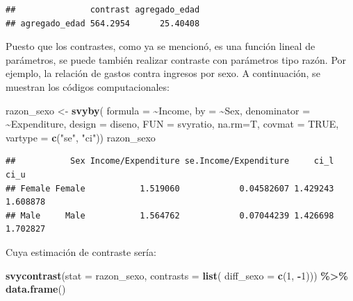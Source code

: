 \documentclass[
  spanish,
  12pt,
]{book}
\newenvironment{Shaded}{\begin{snugshade}}{\end{snugshade}}
\newcommand{\AttributeTok}[1]{\textcolor[rgb]{0.13,0.29,0.53}{#1}}
\newcommand{\ConstantTok}[1]{\textcolor[rgb]{0.56,0.35,0.01}{#1}}
\newcommand{\DecValTok}[1]{\textcolor[rgb]{0.00,0.00,0.81}{#1}}
\newcommand{\FunctionTok}[1]{\textcolor[rgb]{0.13,0.29,0.53}{\textbf{#1}}}
\newcommand{\NormalTok}[1]{#1}
\newcommand{\OtherTok}[1]{\textcolor[rgb]{0.56,0.35,0.01}{#1}}
\newcommand{\SpecialCharTok}[1]{\textcolor[rgb]{0.81,0.36,0.00}{\textbf{#1}}}
\newcommand{\StringTok}[1]{\textcolor[rgb]{0.31,0.60,0.02}{#1}}
\begin{document}
\begin{verbatim}
##               contrast agregado_edad
## agregado_edad 564.2954      25.40408
\end{verbatim}

Puesto que los contrastes, como ya se mencionó, es una función lineal de parámetros, se puede también realizar contraste con parámetros tipo razón. Por ejemplo, la relación de gastos contra ingresos por sexo. A continuación, se muestran los códigos computacionales:

\begin{Shaded}
\begin{Highlighting}[]
\NormalTok{razon\_sexo }\OtherTok{\textless{}{-}} \FunctionTok{svyby}\NormalTok{( }\AttributeTok{formula =} \SpecialCharTok{\textasciitilde{}}\NormalTok{Income,}
                     \AttributeTok{by =} \SpecialCharTok{\textasciitilde{}}\NormalTok{Sex,}
                     \AttributeTok{denominator =} \SpecialCharTok{\textasciitilde{}}\NormalTok{Expenditure,}
                     \AttributeTok{design =}\NormalTok{ diseno,}
                     \AttributeTok{FUN =}\NormalTok{ svyratio,}
                     \AttributeTok{na.rm=}\NormalTok{T, }\AttributeTok{covmat =} \ConstantTok{TRUE}\NormalTok{,}
                     \AttributeTok{vartype =} \FunctionTok{c}\NormalTok{(}\StringTok{"se"}\NormalTok{, }\StringTok{"ci"}\NormalTok{))}
\NormalTok{razon\_sexo}
\end{Highlighting}
\end{Shaded}

\begin{verbatim}
##           Sex Income/Expenditure se.Income/Expenditure     ci_l     ci_u
## Female Female           1.519060            0.04582607 1.429243 1.608878
## Male     Male           1.564762            0.07044239 1.426698 1.702827
\end{verbatim}

Cuya estimación de contraste sería:

\begin{Shaded}
\begin{Highlighting}[]
\FunctionTok{svycontrast}\NormalTok{(}\AttributeTok{stat =}\NormalTok{ razon\_sexo,}
            \AttributeTok{contrasts =} \FunctionTok{list}\NormalTok{(}
                             \AttributeTok{diff\_sexo =} \FunctionTok{c}\NormalTok{(}\DecValTok{1}\NormalTok{, }\SpecialCharTok{{-}}\DecValTok{1}\NormalTok{))) }\SpecialCharTok{\%\textgreater{}\%} \FunctionTok{data.frame}\NormalTok{()}
\end{Highlighting}
\end{Shaded}
\end{document}
